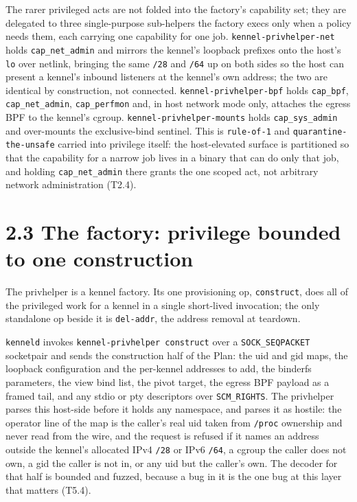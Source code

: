 The rarer privileged acts are not folded into the factory's capability
set; they are delegated to three single-purpose sub-helpers the factory
execs only when a policy needs them, each carrying one capability for
one job. \texttt{kennel-privhelper-net} holds \texttt{cap\_net\_admin}
and mirrors the kennel's loopback prefixes onto the host's \texttt{lo}
over netlink, bringing the same \texttt{/28} and \texttt{/64} up on both
sides so the host can present a kennel's inbound listeners at the
kennel's own address; the two are identical by construction, not
connected. \texttt{kennel-privhelper-bpf} holds \texttt{cap\_bpf},
\texttt{cap\_net\_admin}, \texttt{cap\_perfmon} and, in host network
mode only, attaches the egress BPF to the kennel's cgroup.
\texttt{kennel-privhelper-mounts} holds \texttt{cap\_sys\_admin} and
over-mounts the exclusive-bind sentinel. This is \texttt{rule-of-1} and
\texttt{quarantine-the-unsafe} carried into privilege itself: the
host-elevated surface is partitioned so that the capability for a narrow
job lives in a binary that can do only that job, and holding
\texttt{cap\_net\_admin} there grants the one scoped act, not arbitrary
network administration (T2.4).

\hypertarget{the-factory-privilege-bounded-to-one-construction}{%
\section{2.3 The factory: privilege bounded to one
construction}\label{the-factory-privilege-bounded-to-one-construction}}

The privhelper is a kennel factory. Its one provisioning op,
\texttt{construct}, does all of the privileged work for a kennel in a
single short-lived invocation; the only standalone op beside it is
\texttt{del-addr}, the address removal at teardown.

\texttt{kenneld} invokes \texttt{kennel-privhelper\ construct} over a
\texttt{SOCK\_SEQPACKET} socketpair and sends the construction half of
the Plan: the uid and gid maps, the loopback configuration and the
per-kennel addresses to add, the binderfs parameters, the view bind
list, the pivot target, the egress BPF payload as a framed tail, and any
stdio or pty descriptors over \texttt{SCM\_RIGHTS}. The privhelper
parses this host-side before it holds any namespace, and parses it as
hostile: the operator line of the map is the caller's real uid taken
from \texttt{/proc} ownership and never read from the wire, and the
request is refused if it names an address outside the kennel's allocated
IPv4 \texttt{/28} or IPv6 \texttt{/64}, a cgroup the caller does not
own, a gid the caller is not in, or any uid but the caller's own. The
decoder for that half is bounded and fuzzed, because a bug in it is the
one bug at this layer that matters (T5.4).

